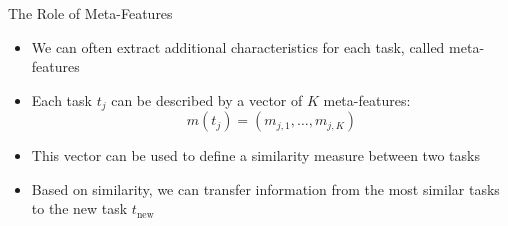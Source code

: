 \begin{frame}[c]{The Role of Meta-Features}

\begin{itemize}
    \item We can often extract additional characteristics for each task, called \alert{meta-features}
    \item Each task $t_j$ can be described by a vector of $K$ meta-features:
        \begin{equation*}
            m(t_j) = (m_{j, 1}, \dots, m_{j, K})
        \end{equation*}
\medskip
\pause
    \item This vector can be used to define a \alert{similarity measure} between two tasks
\smallskip
    \item Based on similarity, we can transfer information from the most similar tasks to the new task $t_{\text{new}}$
    \end{itemize}

\hspace{11cm}

\end{frame}





